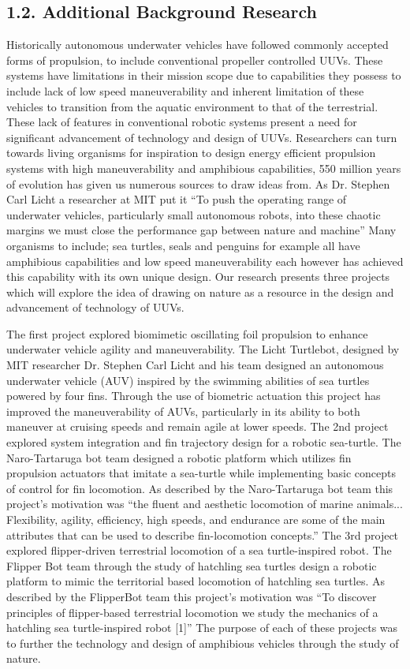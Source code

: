 \documentclass[10pt]{article}
\begin{document}
\subsection{1.2. Additional Background Research}
Historically autonomous underwater vehicles have followed commonly accepted forms of propulsion, to include conventional propeller controlled UUVs. These systems have limitations in their mission scope due to capabilities they possess to include lack of low speed maneuverability and inherent limitation of these vehicles to transition from the aquatic environment to that of the terrestrial. These lack of features in conventional robotic systems present a need for significant advancement of technology and design of UUVs. Researchers can turn towards living organisms for inspiration to design energy efficient propulsion systems with high maneuverability and amphibious capabilities, 550 million years of evolution has given us numerous sources to draw ideas from. As Dr. Stephen Carl Licht a researcher at MIT put it “To push the operating range of underwater vehicles, particularly small autonomous robots, into these chaotic margins we must close the performance gap between nature and machine” Many organisms to include; sea turtles, seals and penguins for example all have amphibious capabilities and low speed maneuverability each however has achieved this capability with its own unique design. Our research presents three projects which will explore the idea of drawing on nature as a resource in the design and advancement of technology of UUVs. 

The first project explored biomimetic oscillating foil propulsion to enhance underwater vehicle agility and maneuverability. The Licht Turtlebot, designed by MIT researcher Dr. Stephen Carl Licht and his team designed an autonomous underwater vehicle (AUV) inspired by the swimming abilities of sea turtles powered by four fins. Through the use of biometric actuation this project has improved the maneuverability of AUVs, particularly in its ability to both maneuver at cruising speeds and remain agile at lower speeds. The 2nd project explored system integration and fin trajectory design for a robotic sea-turtle. The Naro-Tartaruga bot team designed a robotic platform which utilizes fin propulsion actuators that imitate a sea-turtle while implementing basic concepts of control for fin locomotion. As described by the Naro-Tartaruga bot team this project's motivation was “the fluent and aesthetic locomotion of marine animals... Flexibility, agility, efficiency, high speeds, and endurance are some of the main attributes that can be used to describe fin-locomotion concepts.” The 3rd project explored flipper-driven terrestrial locomotion of a sea turtle-inspired robot. The Flipper Bot team through the study of hatchling sea turtles design a robotic platform to mimic the territorial based locomotion of hatchling sea turtles.  As described by the FlipperBot team this project's motivation was “To discover principles of flipper-based terrestrial locomotion we study the mechanics of a hatchling sea turtle-inspired robot [1]” The purpose of each of these projects was to further the technology and design of amphibious vehicles through the study of nature.
\end{document}
